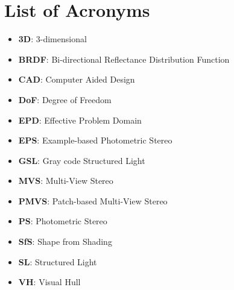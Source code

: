
\chapter{List of Acronyms}

\begin{itemize}
\item \textbf{3D}: 3-dimensional
\item \textbf{BRDF}: Bi-directional Reflectance Distribution Function
\item \textbf{CAD}: Computer Aided Design
\item \textbf{DoF}: Degree of Freedom
\item \textbf{EPD}: Effective Problem Domain
\item \textbf{EPS}: Example-based Photometric Stereo
\item \textbf{GSL}: Gray code Structured Light
\item \textbf{MVS}: Multi-View Stereo
\item \textbf{PMVS}: Patch-based Multi-View Stereo
\item \textbf{PS}: Photometric Stereo
\item \textbf{SfS}: Shape from Shading
\item \textbf{SL}: Structured Light
\item \textbf{VH}: Visual Hull
\end{itemize}